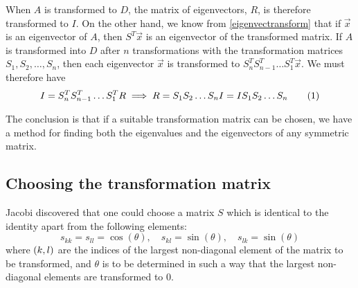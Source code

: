 \documentclass[12pt,english,a4paper]{report}
\newcommand{\eqtag}[1]{\refstepcounter{equation}\tag{\theequation}\label{#1}}
\begin{document}
When \(A\) is transformed to \(D\), the matrix of eigenvectors, \(R\), is therefore transformed to \(I\). On the other hand, we know from \vref{eigenvectransform} that if \(\vec{x}\) is an eigenvector of \(A\), then \(S^T\vec{x}\) is an eigenvector of the transformed matrix. If \(A\) is transformed into \(D\) after \(n\) transformations with the transformation matrices \(S_1,S_2,\dots,S_n\), then each eigenvector \(\vec{x}\) is transformed to \(S_n^TS_{n-1}^T\dots S_1^T\vec{x}\). We must therefore have
\[
I = S_n^TS_{n-1}^T\dots S_1^TR \implies R = S_1S_2\dots S_nI = IS_1S_2\dots S_n \eqtag{findR}
\]

The conclusion is that if a suitable transformation matrix can be chosen, we have a method for finding both the eigenvalues and the eigenvectors of any symmetric matrix.

\subsection{Choosing the transformation matrix}
Jacobi discovered that one could choose a matrix \(S\) which is identical to the identity apart from the following elements:
\[
s_{kk} = s_{ll} = \cos(\theta), \quad s_{kl} = \sin(\theta), \quad s_{lk} = \sin(\theta)
\]
where \(\qty(k,l)\) are the indices of the largest non-diagonal element of the matrix to be transformed, and \(\theta\) is to be determined in such a way that the largest non-diagonal elements are transformed to \(0\).
\end{document}
